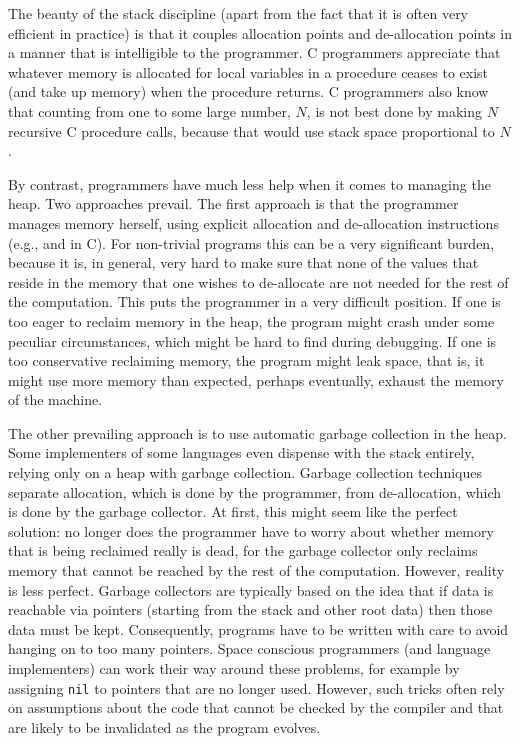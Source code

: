 \documentclass[12pt]{book}
\begin{document}
The beauty of the stack discipline 
(apart from the fact that it is often very efficient in
practice) is that it couples allocation points and de-allocation points in a manner
that is intelligible to the programmer. C programmers appreciate that whatever memory
is allocated for local variables in a procedure ceases to exist (and take up memory)
when the procedure returns. C programmers also know that counting from
one to some large number, $N$,  is not best done by making $N$ recursive
C procedure calls, because that would use stack space proportional to $N$.

By contrast, programmers have much less help when it comes to managing
the heap.  Two approaches prevail. The first approach is that the
programmer manages memory herself, using explicit allocation and
de-allocation instructions (e.g.,  and  in C). For non-trivial
programs this can be a very significant burden, because it is, in
general, very hard to make sure that none of the values that reside in
the memory that one wishes to de-allocate are not needed for the rest
of the computation.  This puts the programmer in a very difficult
position. If one is too eager to reclaim memory in the heap, the
program might crash under some peculiar circumstances, which might be
hard to find during debugging. If one is too conservative reclaiming
memory, the program might leak space, that is, it might use more
memory than expected, perhaps eventually, exhaust the memory of the
machine.

The other prevailing approach is to use automatic garbage collection
in the heap.  Some implementers of some languages even dispense with
the stack entirely, relying only on a heap with garbage collection.
Garbage collection techniques separate allocation, which is done by
the programmer, from de-allocation, which is done by the garbage
collector.  At first, this might seem like the perfect solution: no
longer does the programmer have to worry about whether memory that is
being reclaimed really is dead, for the garbage collector only
reclaims memory that cannot be reached by the rest of the
computation. However, reality is less perfect. Garbage collectors are
typically based on the idea that if data is reachable via pointers
(starting from the stack and other root data) then those data must be
kept. Consequently, programs have to be written with care to avoid
hanging on to too many pointers. Space conscious programmers (and
language implementers) can work their way around these problems, for
example by assigning {\tt nil} to pointers that are no longer used.
However, such tricks often rely on assumptions about the code that
cannot be checked by the compiler and that are likely to be
invalidated as the program evolves.
\end{document}
